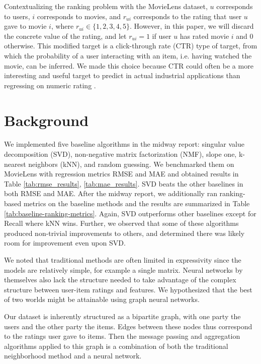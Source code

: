 \documentclass{article}
\begin{document}
Contextualizing the ranking problem with the MovieLens dataset, $u$ corresponds to users, $i$ corresponds to movies, and $r_{ui}$ corresponds to the rating that user $u$ gave to movie $i$, where $r_{ui}\in\{1,2,3,4,5\}$. However, in this paper, we will discard the concrete value of the rating, and let $r_{ui}=1$ if user $u$ has rated movie $i$ and $0$ otherwise. This modified target is a click-through rate (CTR) type of target, from which the probability of a user interacting with an item, i.e. having watched the movie, can be inferred. We made this choice because CTR could often be a more interesting and useful target to predict in actual industrial applications than regressing on numeric rating \cite{ctr}.


\section{Background}


We implemented five baseline algorithms in the midway report: singular value decomposition (SVD), non-negative matrix factorization (NMF), slope one, k-nearest neighbors (kNN), and random guessing. We benchmarked them on MovieLens with regression metrics RMSE and MAE and obtained results in Table \ref{tab:rmse_results}, \ref{tab:mae_results}. SVD beats the other baselines in both RMSE and MAE. After the midway report, we additionally ran ranking-based metrics on the baseline methods and the results are summarized in Table \ref{tab:baseline-ranking-metrics}. Again, SVD outperforms other baselines except for Recall where kNN wins. Further, we observed that some of these algorithms produced non-trivial improvements to others, and determined there was likely room for improvement even upon SVD.

We noted that traditional methods are often limited in expressivity since the models are relatively simple, for example a single matrix. Neural networks by themselves also lack the structure needed to take advantage of the complex structure between user-item ratings and features. We hypothesized that the best of two worlds might be attainable using graph neural networks.

Our dataset is inherently structured as a bipartite graph, with one party the users and the other party the items. Edges between these nodes thus correspond to the ratings user gave to items. Then the message passing and aggregation algorithms applied to this graph is a combination of both the traditional neighborhood method and a neural network. 
\end{document}
